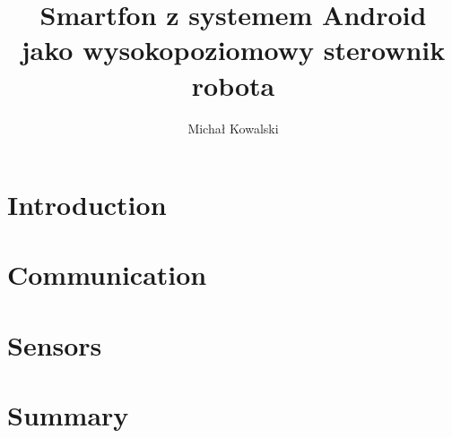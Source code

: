 \documentclass{mgr}
\author{Michał Kowalski} %
\title{Smartfon z systemem Android\\jako wysokopoziomowy sterownik robota}
\begin{document}
\maketitle

\chapter{Introduction}

\chapter{Communication}

\chapter{Sensors}

\chapter{Summary}
\end{document}
